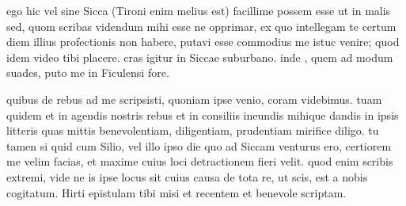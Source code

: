 


 ego hic vel sine Sicca (Tironi enim melius est) facillime possem esse ut in malis sed, quom scribas videndum mihi esse ne opprimar, ex quo intellegam te certum diem illius profectionis non habere, putavi esse commodius me istuc venire; quod idem video tibi placere. cras igitur in Siccae suburbano. inde , quem ad modum suades, puto me in Ficulensi fore.

 quibus de rebus ad me scripsisti, quoniam ipse venio, coram videbimus. tuam quidem et in agendis nostris rebus et in consiliis ineundis mihique dandis in ipsis litteris quas mittis benevolentiam, diligentiam, prudentiam mirifice diligo. tu tamen si quid cum Silio, vel illo ipso die quo ad Siccam venturus ero, certiorem me velim facias, et maxime cuius loci detractionem fieri velit. quod enim scribis extremi, vide ne is ipse locus sit cuius causa de tota re, ut scis, est a nobis cogitatum. Hirti epistulam tibi misi et recentem et benevole scriptam.
